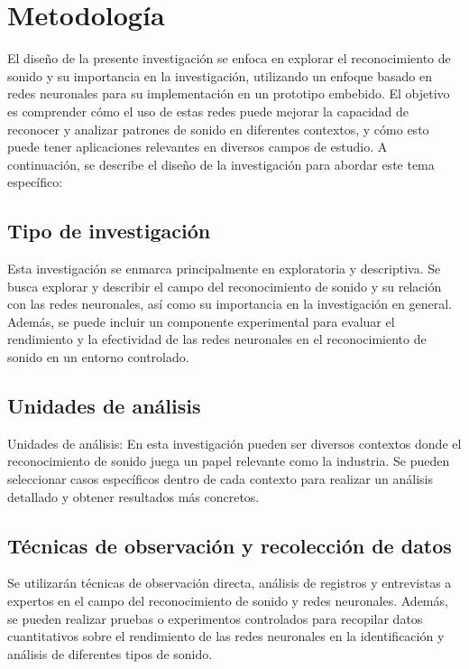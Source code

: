 \newpage
\setcounter{secnumdepth}{0}
\section{Metodología}
El diseño de la presente investigación se enfoca en explorar el reconocimiento de sonido y su importancia en la investigación, utilizando un enfoque basado en redes neuronales para su implementación en un prototipo embebido. El objetivo es comprender cómo el uso de estas redes puede mejorar la capacidad de reconocer y analizar patrones de sonido en diferentes contextos, y cómo esto puede tener aplicaciones relevantes en diversos campos de estudio. A continuación, se describe el diseño de la investigación para abordar este tema específico:

\subsection{Tipo de investigación}
Esta investigación se enmarca principalmente en exploratoria y descriptiva. Se busca explorar y describir el campo del reconocimiento de sonido y su relación con las redes neuronales, así como su importancia en la investigación en general. Además, se puede incluir un componente experimental para evaluar el rendimiento y la efectividad de las redes neuronales en el reconocimiento de sonido en un entorno controlado.

\subsection{Unidades de análisis}
Unidades de análisis: En esta investigación pueden ser diversos contextos donde el reconocimiento de sonido juega un papel relevante como la industria. Se pueden seleccionar casos específicos dentro de cada contexto para realizar un análisis detallado y obtener resultados más concretos.

\subsection{Técnicas de observación y recolección de datos}
Se utilizarán técnicas de observación directa, análisis de registros y entrevistas a expertos en el campo del reconocimiento de sonido y redes neuronales. Además, se pueden realizar pruebas o experimentos controlados para recopilar datos cuantitativos sobre el rendimiento de las redes neuronales en la identificación y análisis de diferentes tipos de sonido.

